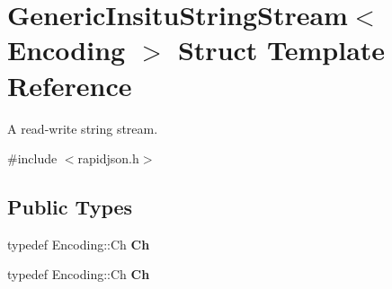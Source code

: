 \hypertarget{structGenericInsituStringStream}{}\section{Generic\+Insitu\+String\+Stream$<$ Encoding $>$ Struct Template Reference}
\label{structGenericInsituStringStream}


A read-\/write string stream.  




{\ttfamily \#include $<$rapidjson.\+h$>$}

\subsection*{Public Types}
\begin{DoxyCompactItemize}
\item 
\mbox{\label{structGenericInsituStringStream_a277308a58f551f11d0d9a20823702b5a}} 
typedef Encoding\+::\+Ch {\bfseries Ch}
\item 
\mbox{\label{structGenericInsituStringStream_a277308a58f551f11d0d9a20823702b5a}} 
typedef Encoding\+::\+Ch {\bfseries Ch}
\end{DoxyCompactItemize}
